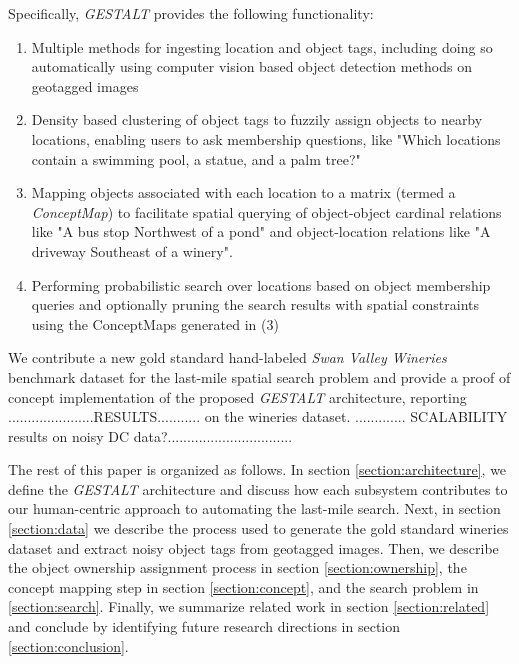 Specifically, \emph{GESTALT} provides the following functionality:
\begin{enumerate}
    \item Multiple methods for ingesting location and object tags, including doing so automatically using computer vision based object detection methods on geotagged images
    \item Density based clustering of object tags to fuzzily assign objects to nearby locations, enabling users to ask membership questions, like "Which locations contain a swimming pool, a statue, and a palm tree?"
    \item Mapping objects associated with each location to a matrix (termed a \emph{ConceptMap}) to facilitate spatial querying of object-object cardinal relations like "A bus stop Northwest of a pond" and object-location relations like "A driveway Southeast of a winery".
    \item Performing probabilistic search over locations based on object membership queries and optionally pruning the search results with spatial constraints using the ConceptMaps generated in (3)
\end{enumerate}

We contribute a new gold standard hand-labeled \textit{Swan Valley Wineries} benchmark dataset for the last-mile spatial search problem and provide a proof of concept implementation of the proposed \emph{GESTALT} architecture, reporting ......................RESULTS........... on the wineries dataset.
............. SCALABILITY results on noisy DC data?................................

The rest of this paper is organized as follows. In section \ref{section:architecture}, we define the \emph{GESTALT} architecture and discuss how each subsystem contributes to our human-centric approach to automating the last-mile search. 
Next, in section \ref{section:data} we describe the process used to generate the gold standard wineries dataset and extract noisy object tags from geotagged images. Then, we describe the object ownership assignment process in section \ref{section:ownership}, the concept mapping step in section \ref{section:concept}, and the search problem in \ref{section:search}. 
Finally, we summarize related work in section \ref{section:related} and conclude by identifying future research directions in section \ref{section:conclusion}.


